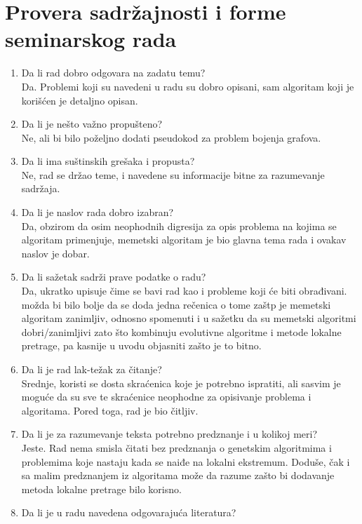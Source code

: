 \documentclass[a4paper]{report}
\begin{document}
\section{Provera sadržajnosti i forme seminarskog rada}

\begin{enumerate}
\item Da li rad dobro odgovara na zadatu temu?\\
Da. Problemi koji su navedeni u radu su dobro opisani, sam algoritam koji je korišćen je detaljno opisan. 
\item Da li je nešto važno propušteno?\\
Ne, ali bi bilo poželjno dodati pseudokod za problem bojenja grafova.
\item Da li ima suštinskih grešaka i propusta?\\
Ne, rad se držao teme, i navedene su informacije bitne za razumevanje sadržaja. 
\item Da li je naslov rada dobro izabran?\\
Da, obzirom da osim neophodnih digresija za opis problema na kojima se algoritam primenjuje, memetski algoritam je bio glavna tema rada i ovakav naslov je dobar.
\item Da li sažetak sadrži prave podatke o radu?\\
Da, ukratko upisuje čime se bavi rad kao i probleme koji će biti obrađivani. možda bi bilo bolje da se doda jedna rečenica o tome zaštp je memetski algoritam zanimljiv, odnosno spomenuti i u sažetku da su memetski algoritmi dobri/zanimljivi zato što kombinuju evolutivne algoritme i metode lokalne pretrage, pa kasnije u uvodu objasniti zašto je to bitno.
\item Da li je rad lak-težak za čitanje?\\
Srednje, koristi se dosta skraćenica koje je potrebno ispratiti, ali sasvim je moguće da su sve te skraćenice neophodne za opisivanje problema i algoritama. Pored toga, rad je bio čitljiv.
\item Da li je za razumevanje teksta potrebno predznanje i u kolikoj meri?\\
Jeste. Rad nema smisla čitati bez predznanja o genetskim algoritmima i problemima koje nastaju kada se naiđe na lokalni ekstremum. Doduše, čak i sa malim predznanjem iz algoritama može da razume zašto bi dodavanje metoda lokalne pretrage bilo korisno.
\item Da li je u radu navedena odgovarajuća literatura?\\

\end{enumerate}
\end{document}
